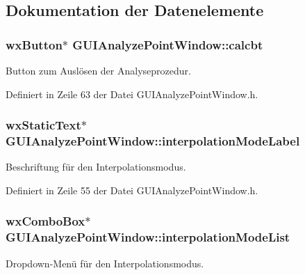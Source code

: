 \subsection{Dokumentation der Datenelemente}
\hypertarget{classGUIAnalyzePointWindow_a2650076436d57254fa9dd0df3783593e}{
\subsubsection[{calcbt}]{\setlength{\rightskip}{0pt plus 5cm}wx\-Button$\ast$ G\-U\-I\-Analyze\-Point\-Window\-::calcbt\hspace{0.3cm}{\ttfamily [private]}}}\label{classGUIAnalyzePointWindow_a2650076436d57254fa9dd0df3783593e}
Button zum Auslösen der Analyseprozedur. 

Definiert in Zeile 63 der Datei G\-U\-I\-Analyze\-Point\-Window.\-h.

\hypertarget{classGUIAnalyzePointWindow_a6a1b5c74ab4aca0f3ccea3ef83043b35}{
\subsubsection[{interpolation\-Mode\-Label}]{\setlength{\rightskip}{0pt plus 5cm}wx\-Static\-Text$\ast$ G\-U\-I\-Analyze\-Point\-Window\-::interpolation\-Mode\-Label\hspace{0.3cm}{\ttfamily [private]}}}\label{classGUIAnalyzePointWindow_a6a1b5c74ab4aca0f3ccea3ef83043b35}
Beschriftung für den Interpolationsmodus. 

Definiert in Zeile 55 der Datei G\-U\-I\-Analyze\-Point\-Window.\-h.

\hypertarget{classGUIAnalyzePointWindow_a6b2da34e788e56e70789d2cfc9767357}{
\subsubsection[{interpolation\-Mode\-List}]{\setlength{\rightskip}{0pt plus 5cm}wx\-Combo\-Box$\ast$ G\-U\-I\-Analyze\-Point\-Window\-::interpolation\-Mode\-List\hspace{0.3cm}{\ttfamily [private]}}}\label{classGUIAnalyzePointWindow_a6b2da34e788e56e70789d2cfc9767357}
Dropdown-\/\-Menü für den Interpolationsmodus. 

